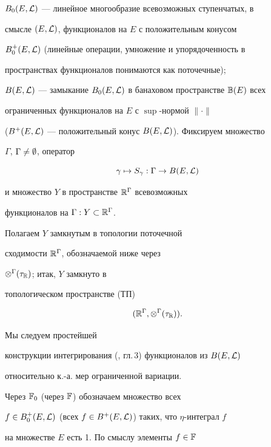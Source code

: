 $B_0(E, {\cal L})$ --- линейное многообразие всевозможных ступенчатых, в


смысле $(E, {\cal L})$, функционалов на $E$ с положительным конусом


$B_0^+(E, {\cal L})$ (линейные операции, умножение и упорядоченность в


пространствах функционалов понимаются как поточечные);


$B(E, {\cal L})$ --- замыкание $B_0(E, {\cal L})$ в банаховом пространстве ${\Bbb B}(E)$ всех


ограниченных функционалов на $E$ с $\sup$-нормой $\|\cdot\|$


($B^+(E, {\cal L})$ --- положительный конус $B(E, {\cal L})$). Фиксируем множество


$\Gamma$, $\Gamma\ne\emptyset$, оператор


%


\begin{equation}


\gamma \mapsto S_{\gamma}: \Gamma \to B \eL


\end{equation}


%


и множество $Y$ в пространстве ${\Bbb R}^\Gamma$ всевозможных


функционалов на $\Gamma: Y \subset {\Bbb R}^\Gamma$.


Полагаем $Y$ замкнутым в топологии поточечной


сходимости ${\Bbb R}^\Gamma$, обозначаемой ниже через


$\otimes^\Gamma(\tau_{\Bbb R})$; итак, $Y$ замкнуто в


топологическом пространстве (ТП)


%


\begin{equation}


({\Bbb R}^\Gamma, \otimes^\Gamma(\tau_{\Bbb R})).


\end{equation}


Мы следуем простейшей


конструкции интегрирования (\cite{Ch1}, гл.\,3) функционалов из $B(E, {\cal L})$


относительно к.-а. мер ограниченной вариации.


Через ${\Bbb F}_0$ (через ${\Bbb F}$) обозначаем множество всех


$f\in B^+_0(E, {\cal L})$ (всех $f \in B^+(E, {\cal L})$) таких, что $\eta$-интеграл $f$


на множестве $E$ есть 1. По смыслу элементы $f \in {\Bbb F}$ 


